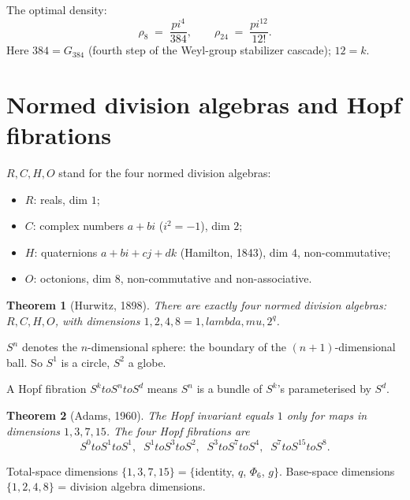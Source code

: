 \documentclass[11pt]{article}
\def\mathbb#1{#1}%
\def\textbf#1{#1}%
\def\lambda{lambda}%
\def\mu{mu}%
\def\Phi#1{Phi#1}%
\def\pi{pi}%
\def\to{ to }%
\newtheorem*{theorem}{Theorem}
\begin{document}
The optimal density:
\[
\rho_8 \;=\; \frac{\pi^4}{384}, \qquad \rho_{24} \;=\; \frac{\pi^{12}}{12!}.
\]
Here $384 = G_{384}$ (fourth step of the Weyl-group stabilizer cascade); $12 = k$.

\section{Normed division algebras and Hopf fibrations}

\begin{mathnote}
$\mathbb{R}, \mathbb{C}, \mathbb{H}, \mathbb{O}$ stand for the four normed division algebras:
\begin{itemize}[leftmargin=2em]
\item $\mathbb{R}$: reals, dim $1$;
\item $\mathbb{C}$: complex numbers $a + bi$ ($i^2 = -1$), dim $2$;
\item $\mathbb{H}$: quaternions $a + bi + cj + dk$ (Hamilton, 1843), dim $4$, non-commutative;
\item $\mathbb{O}$: octonions, dim $8$, non-commutative and non-associative.
\end{itemize}
\end{mathnote}

\begin{theorem}[Hurwitz, 1898]
There are exactly four normed division algebras: $\mathbb{R}, \mathbb{C}, \mathbb{H}, \mathbb{O}$, with dimensions $1, 2, 4, 8 = 1, \lambda, \mu, 2^q$.
\end{theorem}

\begin{mathnote}
$S^n$ denotes the \textbf{$n$-dimensional sphere}: the boundary of the $(n+1)$-dimensional ball. So $S^1$ is a circle, $S^2$ a globe.

A \textbf{Hopf fibration} $S^k \to S^n \to S^d$ means $S^n$ is a bundle of $S^k$'s parameterised by $S^d$.
\end{mathnote}

\begin{theorem}[Adams, 1960]
The Hopf invariant equals $1$ only for maps in dimensions $1, 3, 7, 15$. The four Hopf fibrations are
\[
S^0\!\to S^1\!\to S^1, \;\; S^1\!\to S^3\!\to S^2, \;\; S^3\!\to S^7\!\to S^4, \;\; S^7\!\to S^{15}\!\to S^8.
\]
\end{theorem}

Total-space dimensions $\{1, 3, 7, 15\} = \{$identity, $q$, $\Phi_6$, $g\}$. Base-space dimensions $\{1, 2, 4, 8\}$ = division algebra dimensions.
\end{document}
